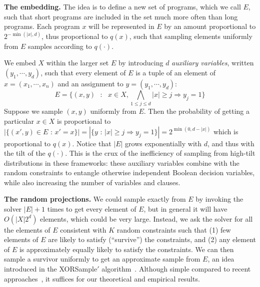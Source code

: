 \documentclass{article}
\begin{document}
\textbf{The embedding.} The idea is to define a new set of programs, which we call $E$, such that short programs are included in the set much more often than long programs.
Each program $x$ will be represented in $E$ by an amount proportional to $2^{-\min (\lvert x \rvert ,d)}$, thus proportional to $q(x)$,
such that sampling elements uniformly from $E$  samples according to $q(\cdot )$.

We embed $X$ within the larger set $E$ by introducing $d$ \emph{auxiliary variables}, written $(y_1,\cdots, y_d)$,
such that every element of $E$ is a tuple of an element of $x = (x_1,\cdots , x_n )$ and an assignment to $y = (y_1,\cdots, y_d)$:
  \begin{equation}
    E = \{(x,y) \text{ }:\text{ } x\in X,  \bigwedge_{1\leq j \leq d} \lvert x \rvert \geq j\Rightarrow y_j=1 \}
  \end{equation}
  Suppose we sample $(x,y)$ uniformly from $E$.
  Then the probability of getting a particular $x\in X$ is proportional to
  $|\{(x',y)\in E \text{ : } x' = x\}| = |\{y\text{ : } \lvert x \rvert \geq j\Rightarrow y_j=1\}|=2^{\min (0,d-\lvert x \rvert )}$ 
  which is proportional to $q(x)$. Notice that $|E|$ grows exponentially with $d$, and thus with the tilt of the $q(\cdot )$.
  This is the crux of the inefficiency of sampling from high-tilt distributions in these frameworks:
  these auxiliary variables combine with the random constraints to entangle otherwise independent Boolean decision variables,
  while also increasing the number of variables and clauses.

  \textbf{The random projections.} We  could sample exactly from $E$  by invoking the solver $|E|+1$ times to get every element of $E$,
  but in general it will have $O(|X|2^d)$ elements, which could be very large.
  Instead, we ask the solver for all the elements of $E$ consistent with $K$ random constraints
  such that (1) few elements of $E$ are likely to satisfy (``survive'') the constraints,
  and (2) any element of $E$ is approximately equally likely to satisfy the constraints.
  We can then sample a survivor uniformly to get an approximate sample from $E$, an idea introduced in the XORSample$'$ algorithm~\cite{gomes2006near}.
  Although simple compared to recent approaches~\cite{AAAI148364,ermon2014low,achlioptas2015stochastic}, it suffices for our theoretical and empirical results.
\end{document}
